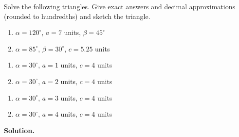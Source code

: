 \begin{ex}  \label{losex} Solve the following triangles.  Give exact answers and decimal approximations (rounded to hundredths) and sketch the triangle.

\begin{multicols}{2}

\begin{enumerate}

\item  \label{losaas} $\alpha = 120^{\circ}$, $a = 7$ units, $\beta = 45^{\circ}$
\item  \label{losasa} $\alpha = 85^{\circ}$, $\beta = 30^{\circ}$, $c = 5.25$ units

\setcounter{HW}{\value{enumi}}

\end{enumerate}

\end{multicols}

\begin{multicols}{2} 

\begin{enumerate}

\setcounter{enumi}{\value{HW}}

\item  \label{losnotriangleex} $\alpha = 30^{\circ}$, $a=1$ units, $c = 4$ units
\item  \label{losrighttriangleex} $\alpha = 30^{\circ}$, $a=2$ units, $c = 4$ units

\setcounter{HW}{\value{enumi}}

\end{enumerate}

\end{multicols}

\begin{multicols}{2} 

\begin{enumerate}

\setcounter{enumi}{\value{HW}}

\item  \label{lostwotriangleex} $\alpha = 30^{\circ}$, $a=3$ units, $c = 4$ units
\item  \label{losonetriangleex} $\alpha = 30^{\circ}$, $a=4$ units, $c = 4$ units

\end{enumerate}

\end{multicols}

{\bf Solution.}  


\end{ex}
